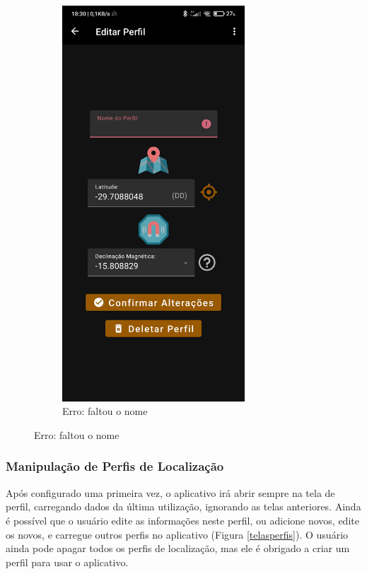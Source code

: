 \begin{figure}[H]
\begin{subfigure}[b]{0.3\textwidth}
		\includegraphics[width=0.75\textwidth]{figuras/desAplicativo/erroescrita}
		\caption{Erro: faltou o nome}
		\label{elev}
	\end{subfigure}
\end{figure}



\subsubsection{Manipulação de Perfis de Localização}
Após configurado uma primeira vez, o aplicativo irá abrir sempre na tela de perfil, carregando dados da última utilização, ignorando as telas anteriores. Ainda é possível que o usuário edite as informações neste perfil, ou adicione novos, edite os novos, e carregue outros perfis no aplicativo (Figura \ref{telasperfis}). O usuário ainda pode apagar todos os perfis de localização, mas ele é obrigado a criar um perfil para usar o aplicativo.

